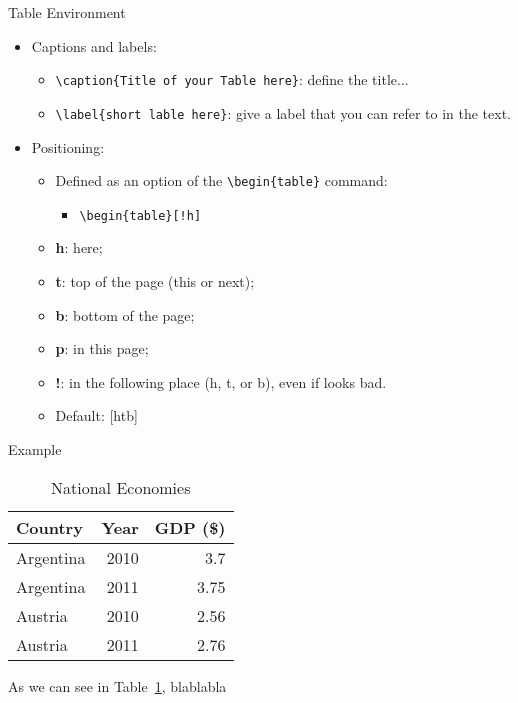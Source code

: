 \documentclass{beamer}
\begin{document}
\begin{frame}[fragile]{Table Environment}
	\begin{itemize}
		\item Captions and labels:
		\begin{itemize}
			\item \verb|\caption{Title of your Table here}|: define the title...
			\item \verb|\label{short lable here}|: give a label that you can refer to in the text.
		\end{itemize}
		\item Positioning:
		\begin{itemize}
			\item Defined as an option of the \verb|\begin{table}| command:
			\begin{itemize}
				\item \verb|\begin{table}[!h]|
			\end{itemize}
			\item \textbf{h}: here;
			\item \textbf{t}: top of the page (this or next);
			\item \textbf{b}: bottom of the page;
			\item \textbf{p}: in this page;
			\item \textbf{!}: in the following place (h, t, or b), even if looks bad.
			\item Default: [htb]
		\end{itemize}
	\end{itemize}
\end{frame}

\begin{frame}{Example}
	\begin{table}
			\caption{National Economies}
			\label{tab:nat:eco}
	\begin{tabular}{l r r} \toprule
		\textbf{Country} & \textbf{Year} &
		\textbf{GDP (\$)} \\ \midrule
		Argentina & 2010 & 3.7 \\
		Argentina & 2011 & 3.75 \\
		Austria & 2010 & 2.56 \\
		Austria & 2011 & 2.76 \\ \bottomrule
	\end{tabular}
	\end{table} 
	As we can see in Table~\ref{tab:nat:eco}, blablabla
\end{frame}
\end{document}
